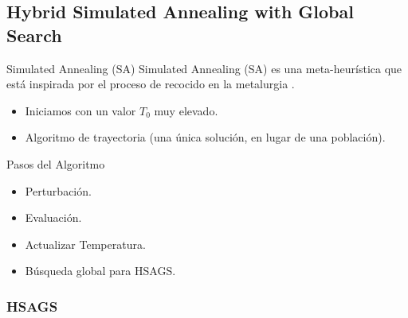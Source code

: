 \subsection{Hybrid Simulated Annealing with Global Search}

\begin{frame}{}
\begin{block}{Simulated Annealing (SA)}
Simulated Annealing (SA) \citep{SA1, SA2, SA3} es una meta-heurística que está inspirada por el proceso de recocido en la metalurgia \citep{metabook}.
\begin{itemize}
  \item Iniciamos con un valor $T_{0}$ muy elevado.
  \item Algoritmo de trayectoria (una única solución, en lugar de una población).
\end{itemize}
\end{block}
\begin{block}{Pasos del Algoritmo}
\begin{itemize}
  \item Perturbación.
  \item Evaluación.
  \item Actualizar Temperatura.
  \item Búsqueda global para HSAGS.
\end{itemize}
\end{block}
\end{frame}

\begin{frame}
\frametitle{HSAGS}
\centering
\end{frame}
